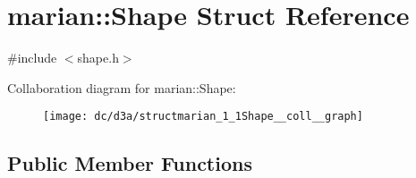 \hypertarget{structmarian_1_1Shape}{}\section{marian\+:\+:Shape Struct Reference}
\label{structmarian_1_1Shape}


{\ttfamily \#include $<$shape.\+h$>$}



Collaboration diagram for marian\+:\+:Shape\+:
\nopagebreak
\begin{figure}[H]
\begin{center}
\leavevmode
\texttt{[image: dc/d3a/structmarian\_1\_1Shape\_\_coll\_\_graph]}
\end{center}
\end{figure}
\subsection*{Public Member Functions}
